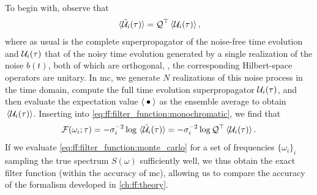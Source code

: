To begin with, observe that
\begin{align}
    \expval*{\mathcal{\tilde{U}}_i(\tau)} = \mathcal{Q}^\top \expval*{\mathcal{U}_i(\tau)},
\end{align}
where as usual \liouvQ is the complete superpropagator of the noise-free time evolution and $\mathcal{U}_i(\tau)$ that of the noisy time evolution generated by a single realization of the noise $b(t)$, both of which are orthogonal, \ie, the corresponding Hilbert-space operators are unitary.
In \gls{mc}, we generate $N$ realizations of this noise process in the time domain, compute the full time evolution superpropagator $\mathcal{U}_i(\tau)$, and then evaluate the expectation value $\expval{\:\bullet\:}$ as the ensemble average to obtain $\ev*{\liouvU_i(\tau)}$.
Inserting into \cref{eq:ff:filter_function:monochromatic}, we find that
\begin{equation}\label{eq:ff:filter_function:monte_carlo}
    \mc{F}(\omega_i; \tau) = -\sigma_i^{-2}\log\expval*{\liouvUe_i(\tau)} = -\sigma_i^{-2}\log\liouvQ\transpose\expval{\liouvU_i(\tau)}.
\end{equation}
If we evaluate \cref{eq:ff:filter_function:monte_carlo} for a set of frequencies $\lbrace\omega_i\rbrace_i$ sampling the true spectrum $S(\omega)$ sufficiently well, we thus obtain the exact filter function \FFot (within the accuracy of \gls{mc}), allowing us to compare the accuracy of the formalism developed in \cref{ch:ff:theory}.

